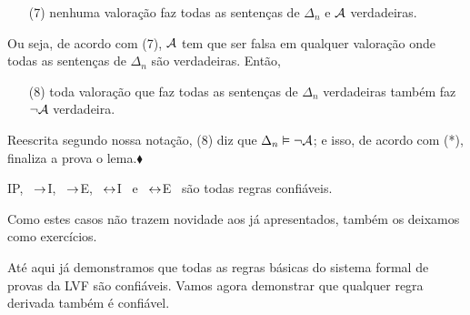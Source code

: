 \begin{itemize}
	\item[(7)] nenhuma valoração faz todas as sentenças de $\Delta_n$ e $\mathcal{A}$ verdadeiras.
\end{itemize}
Ou seja, de acordo com (7), $\mathcal{A}$ tem que ser falsa em qualquer valoração onde todas as sentenças de $\Delta_n$ são verdadeiras. Então, 
\begin{itemize}
	\item[(8)] toda valoração que faz todas as sentenças de $\Delta_n$ verdadeiras também faz $\neg\mathcal{A}$ verdadeira.
\end{itemize}
Reescrita segundo nossa notação, (8) diz que $\Delta_n \vDash \neg\mathcal{A}$; e isso, de acordo com (*), finaliza a prova o lema.$\blacklozenge$

%

\begin{factoidboxe}\label{lem:LastRuleSound} IP, \ $\rightarrow$I, \ $\rightarrow$E, \ $\leftrightarrow$I \ e \ $\leftrightarrow$E \ são todas regras confiáveis.
\end{factoidboxe}

Como estes casos não trazem novidade aos já apresentados, também os deixamos como exercícios.

Até aqui já demonstramos que todas as regras básicas do sistema formal de provas da LVF são confiáveis.
Vamos agora demonstrar que qualquer regra derivada também é confiável.

